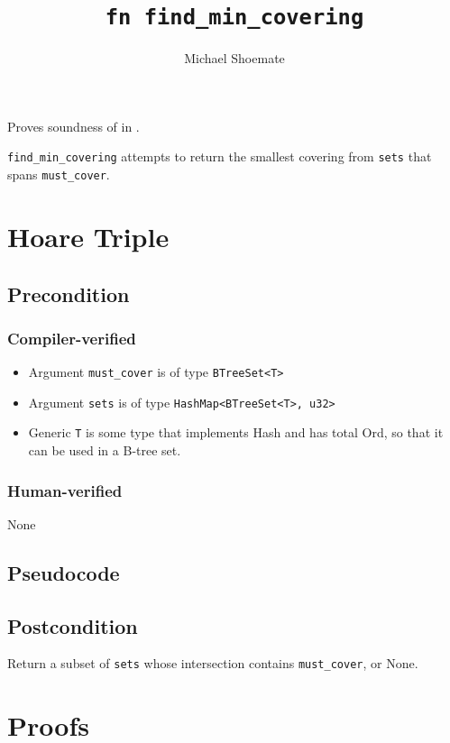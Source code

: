 \documentclass{article}
\title{\texttt{fn find\_min\_covering}}
\author{Michael Shoemate}
\date{}
\begin{document}
\maketitle

\contrib
Proves soundness of  in .

\texttt{find\_min\_covering} attempts to return the smallest covering 
from \texttt{sets} that spans \texttt{must\_cover}.

\section{Hoare Triple}
\subsection*{Precondition}
\subsubsection*{Compiler-verified}
\begin{itemize}
    \item Argument \texttt{must\_cover} is of type \texttt{BTreeSet<T>}
    \item Argument \texttt{sets} is of type \texttt{HashMap<BTreeSet<T>, u32>}
    \item Generic \texttt{T} is some type that implements Hash and has total Ord, so that it can be used in a B-tree set.
\end{itemize}

\subsubsection*{Human-verified}
None

\subsection*{Pseudocode}


\subsection*{Postcondition}
Return a subset of \texttt{sets} whose intersection contains \texttt{must\_cover}, or None.

\section{Proofs}
\end{document}
